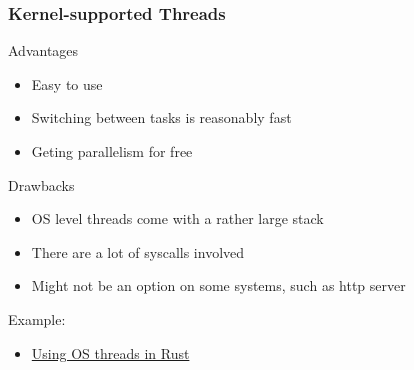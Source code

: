 \begin{frame}[fragile]
    \frametitle{Kernel-supported Threads}
% 
% 
{\color{red}Advantages}
 
     \begin{itemize}
         \item Easy to use
         \item Switching between tasks is reasonably fast
         \item Geting parallelism for free
     \end{itemize}
 
{\color{red}Drawbacks}
 
     \begin{itemize}
         \item OS level threads come with a rather large stack
         \item There are a lot of syscalls involved
         \item Might not be an option on some systems, such as http server
     \end{itemize}
 
 Example:
 
     \begin{itemize}
         \item \href{https://cfsamson.github.io/books-futures-explained/0_background_information.html#threads-provided-by-the-operating-system}{Using OS threads in Rust}
     \end{itemize}
 
\end{frame}
